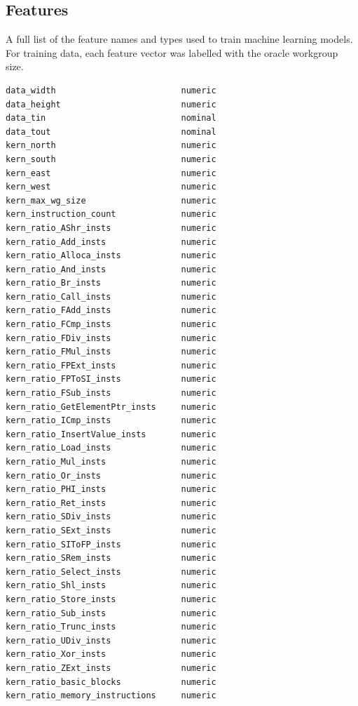 \clearpage
\begin{appendices}

\section{Features}\label{app:features}

A full list of the feature names and types used to train machine
learning models. For training data, each feature vector was labelled
with the oracle workgroup size.

\begin{multicols}{2}
\begin{Verbatim}[fontsize=\footnotesize]
data_width                         numeric
data_height                        numeric
data_tin                           nominal
data_tout                          nominal
kern_north                         numeric
kern_south                         numeric
kern_east                          numeric
kern_west                          numeric
kern_max_wg_size                   numeric
kern_instruction_count             numeric
kern_ratio_AShr_insts              numeric
kern_ratio_Add_insts               numeric
kern_ratio_Alloca_insts            numeric
kern_ratio_And_insts               numeric
kern_ratio_Br_insts                numeric
kern_ratio_Call_insts              numeric
kern_ratio_FAdd_insts              numeric
kern_ratio_FCmp_insts              numeric
kern_ratio_FDiv_insts              numeric
kern_ratio_FMul_insts              numeric
kern_ratio_FPExt_insts             numeric
kern_ratio_FPToSI_insts            numeric
kern_ratio_FSub_insts              numeric
kern_ratio_GetElementPtr_insts     numeric
kern_ratio_ICmp_insts              numeric
kern_ratio_InsertValue_insts       numeric
kern_ratio_Load_insts              numeric
kern_ratio_Mul_insts               numeric
kern_ratio_Or_insts                numeric
kern_ratio_PHI_insts               numeric
kern_ratio_Ret_insts               numeric
kern_ratio_SDiv_insts              numeric
kern_ratio_SExt_insts              numeric
kern_ratio_SIToFP_insts            numeric
kern_ratio_SRem_insts              numeric
kern_ratio_Select_insts            numeric
kern_ratio_Shl_insts               numeric
kern_ratio_Store_insts             numeric
kern_ratio_Sub_insts               numeric
kern_ratio_Trunc_insts             numeric
kern_ratio_UDiv_insts              numeric
kern_ratio_Xor_insts               numeric
kern_ratio_ZExt_insts              numeric
kern_ratio_basic_blocks            numeric
kern_ratio_memory_instructions     numeric

\end{Verbatim}
\end{multicols}
\end{appendices}

